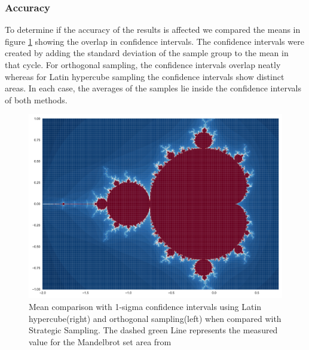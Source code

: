 \documentclass{uva-inf-article}
\begin{document}
\subsubsection{Accuracy}

To determine if the accuracy of the results is affected we compared the means in figure \ref{fig:c_mean} showing the overlap in confidence intervals. The confidence intervals were created by adding the standard deviation of the sample group to the mean in that cycle. For orthogonal sampling, the confidence intervals overlap neatly whereas for Latin hypercube sampling the confidence intervals show distinct areas. In each case, the averages of the samples lie inside the confidence intervals of both methods.\\

\begin{figure}[h!]
  \centering
 \includegraphics[width=.85\textwidth]{fractal.pdf}
  \caption{Mean comparison with 1-sigma confidence intervals using Latin hypercube(right) and orthogonal sampling(left) when compared with Strategic Sampling. The dashed green Line represents the measured value for the Mandelbrot set area from \parencite{mitchell2001}}
  \label{fig:c_mean}
\end{figure}
  
\end{document}
